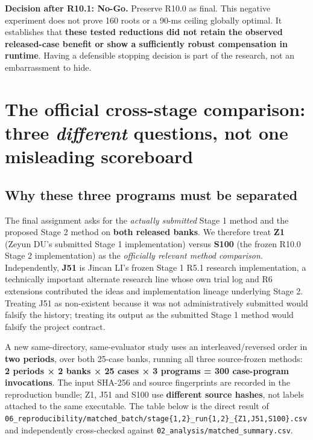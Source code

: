 \begin{tcolorbox}[colback=ResearchBlue!6!white,colframe=ResearchSlate!55!white,boxrule=0.65pt,arc=1mm,breakable]
\textbf{Decision after R10.1: No-Go.} Preserve R10.0 as final. This negative experiment does not prove 160 roots or a 90-ms ceiling globally optimal. It establishes that \textbf{these tested reductions did not retain the observed released-case benefit or show a sufficiently robust compensation in runtime}. Having a defensible stopping decision is part of the research, not an embarrassment to hide.
\end{tcolorbox}

\section{\texorpdfstring{The official cross-stage comparison: three \emph{different} questions, not one misleading scoreboard}{The official cross-stage comparison: three different questions, not one misleading scoreboard}}\label{the-official-cross-stage-comparison-three-different-questions-not-one-misleading-scoreboard}

\subsection{Why these three programs must be separated}\label{why-these-three-programs-must-be-separated}

The final assignment asks for the \emph{actually submitted} Stage 1 method and the proposed Stage 2 method on \textbf{both released banks}. We therefore treat \textbf{Z1} (Zeyun DU's submitted Stage 1 implementation) versus \textbf{S100} (the frozen R10.0 Stage 2 implementation) as the \emph{officially relevant method comparison}. Independently, \textbf{J51} is Jincan LI's frozen Stage 1 R5.1 research implementation, a technically important alternate research line whose own trial log and R6 extensions contributed the ideas and implementation lineage underlying Stage 2. Treating J51 as non-existent because it was not administratively submitted would falsify the history; treating its output as the submitted Stage 1 method would falsify the project contract.

A new same-directory, same-evaluator study uses an interleaved/reversed order in \textbf{two periods}, over both 25-case banks, running all three source-frozen methods: \textbf{2 periods × 2 banks × 25 cases × 3 programs = 300 case-program invocations}. The input SHA-256 and source fingerprints are recorded in the reproduction bundle; Z1, J51 and S100 use \textbf{different source hashes}, not labels attached to the same executable. The table below is the direct result of \texttt{06\_reproducibility/matched\_batch/stage\{1,2\}\_run\{1,2\}\_\{Z1,J51,S100\}.csv} and independently cross-checked against \texttt{02\_analysis/matched\_summary.csv}.

